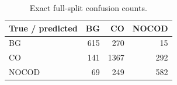 \begin{table}[H]
\centering
\caption{Exact full-split confusion counts.}
\label{tab:confusion}
\begin{tabular}{lrrr}
\toprule
\textbf{True / predicted} & \textbf{BG} & \textbf{CO} & \textbf{NOCOD} \\
\midrule
BG & 615 & 270 & 15 \\
CO & 141 & 1367 & 292 \\
NOCOD & 69 & 249 & 582 \\
\bottomrule
\end{tabular}

\par{}
\end{table}
